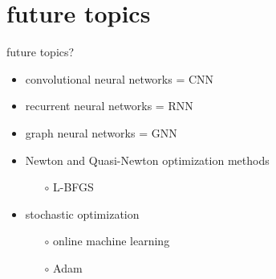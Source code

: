 \documentclass[xcolor={svgnames},
               hyperref={colorlinks,citecolor=DeepPink4,linkcolor=FireBrick,urlcolor=Maroon}]
               {beamer}
\begin{document}
\section{future topics}

\begin{frame}{future topics?}

\begin{itemize}
\item convolutional neural networks = CNN
\item recurrent neural networks = RNN
\item graph neural networks = GNN
\item Newton and Quasi-Newton optimization methods
    \begin{itemize}
    \item[$\circ$] L-BFGS
    \end{itemize}
\item stochastic optimization
    \begin{itemize}
    \item[$\circ$] online machine learning
    \item[$\circ$] Adam
    \end{itemize}
\end{itemize}
\end{frame}
\end{document}

